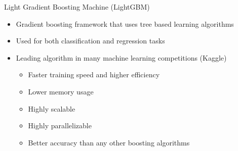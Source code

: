 \documentclass[12pt,ignorenonframetext,]{beamer}
\providecommand{\tightlist}{%
  \setlength{\itemsep}{0pt}\setlength{\parskip}{0pt}}
\begin{document}
\begin{frame}{Light Gradient Boosting Machine (LightGBM)}
\protect\hypertarget{light-gradient-boosting-machine-lightgbm}{}

\begin{itemize}
\tightlist
\item
  Gradient boosting framework that uses tree based learning algorithms
  \vspace{2mm}
\item
  Used for both classification and regression tasks \vspace{2mm}
\item
  Leading algorithm in many machine learning competitions (Kaggle)
  \vspace{2mm}

  \begin{itemize}
      \item Faster training speed and higher efficiency
      \item Lower memory usage
      \item Highly scalable
      \item Highly parallelizable
      \item Better accuracy than any other boosting algorithms
  \end{itemize}
\end{itemize}

\end{frame}
\end{document}
